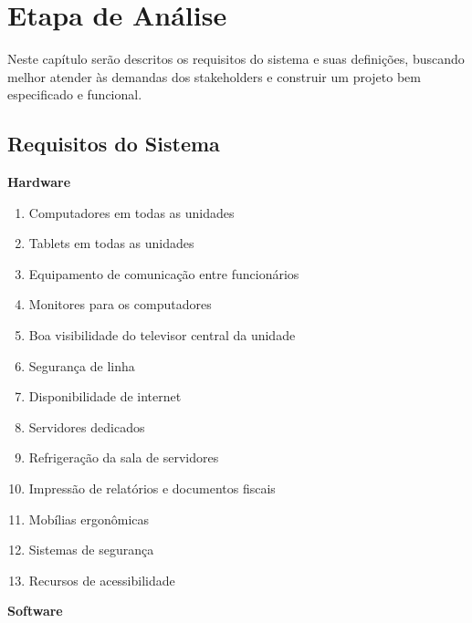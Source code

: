 
\chapter{Etapa de An\'{a}lise}

Neste capítulo serão descritos os requisitos do sistema e suas definições, buscando melhor atender às demandas dos stakeholders e construir um projeto bem especificado e funcional.
\section{Requisitos do Sistema}
\textbf{Hardware}
\begin{enumerate}
	\item Computadores em todas as unidades
	\item Tablets em todas as unidades
	\item Equipamento de comunicação entre funcionários
	\item Monitores para os computadores
	\item Boa visibilidade do televisor central da unidade
	\item Segurança de linha
	\item Disponibilidade de internet
	\item Servidores dedicados
	\item Refrigeração da sala de servidores
	\item Impressão de relatórios e documentos fiscais
	\item Mobílias ergonômicas
	\item Sistemas de segurança
	\item Recursos de acessibilidade
\end{enumerate}
\textbf{Software}
